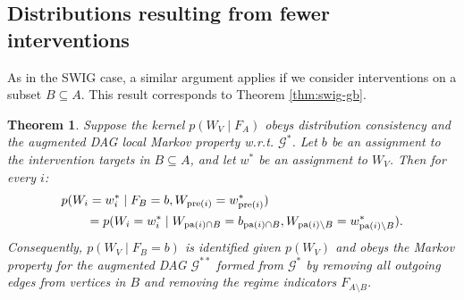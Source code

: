 \documentclass[11pt]{article}
\DeclareMathOperator{\pa}{pa}
\DeclareMathOperator{\pre}{pre}
\newtheorem{theorem}{Theorem}
\newcommand{\G}{{\mathscr G}}
\begin{document}
{\subsection{Distributions resulting from fewer interventions}

As in the SWIG case, a similar argument applies if we consider interventions on a subset $B \subseteq A$.
This result corresponds to Theorem \ref{thm:swig-gb}.

\begin{theorem}
Suppose the kernel $p(W_V \mid F_A)$ obeys distribution consistency and the augmented DAG local Markov property w.r.t. $\G^*$.
Let $b$ be an assignment to the intervention targets in $B\subseteq A$, and let $w^*$ be an assignment to $W_V$. Then for every $i$:
\begin{align}
\MoveEqLeft{p(W_i=w_i^* \mid F_{B}=b, W_{\pre(i)} = w^*_{\pre(i)}) %
}
\nonumber\\
&= p(W_i=w_i^* \mid W_{\pa(i)\cap B}=b_{\pa(i)\cap B}, W_{\pa(i) \setminus B} = w^*_{\pa(i) \setminus B}).\label{eq:modularity-for-b}
\end{align}
Consequently, $p(W_V \mid F_B = b)$ is identified given $p(W_V)$ and obeys the Markov property for the augmented DAG $\G^{**}$ formed from $\G^*$ by removing all outgoing edges from vertices in $B$ and removing the regime indicators $F_{A \setminus B}$.
\end{theorem}


}
\end{document}
